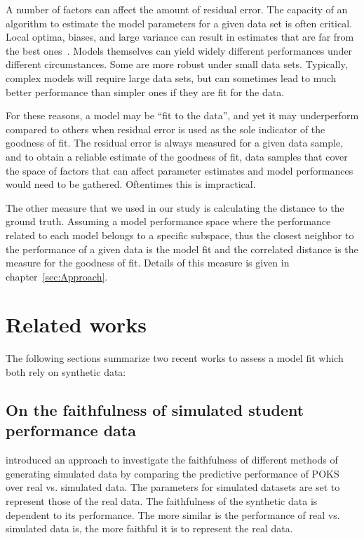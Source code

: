A number of factors can affect the amount of residual error.  The capacity of an algorithm to estimate the model parameters for a given data set is often critical.  Local optima, biases, and large variance can result in estimates that are far from the best ones~\citep{hastie2005elements}.  Models themselves can yield widely different performances under different circumstances.  Some are more robust under small data sets.  Typically, complex models will require large data sets, but can sometimes lead to much better performance than simpler ones if they are fit for the data.

For these reasons, a model may be ``fit to the data'', and yet it may underperform compared to others when residual error is used as the sole indicator of the goodness of fit.  The residual error is always measured for a given data sample, and to obtain a reliable estimate of the goodness of fit, data samples that cover the space of factors that can affect parameter estimates and model performances would need to be gathered.  Oftentimes this is impractical.

 The other measure that we used in our study is calculating the distance to the ground truth. Assuming a model performance space where the performance related to each model belongs to a specific subspace, thus the closest neighbor to the performance of a given data is the model fit and the correlated distance is the measure for the goodness of fit. Details of this measure is given in chapter~\ref{sec:Approach}.

\section{Related works}

The following sections summarize two recent works \citep{Desmarais2010,Rosenberg2015} to assess a model fit which both rely on synthetic data:

\subsection{On the faithfulness of simulated student performance data}

\citet{Desmarais2010} introduced an approach to investigate the faithfulness of different methods of generating simulated data by comparing the predictive performance of POKS over real vs. simulated data. The parameters for simulated datasets are set to represent those of the real data. The faithfulness of the synthetic data is dependent to its performance. The more similar is the performance of real vs. simulated data is, the more faithful it is to represent the real data.

